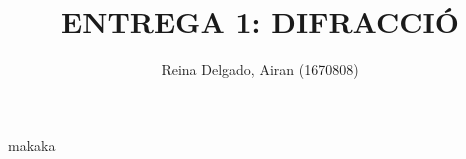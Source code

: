 \documentclass[a4paper, 11pt]{article}
\title{{\textbf{\Large ENTREGA 1: DIFRACCIÓ
}\\}}
\author{Reina Delgado, Airan (1670808)\\}
\date{}
\begin{document}
\maketitle


makaka

\end{document}
